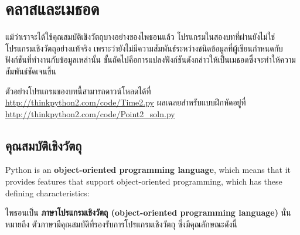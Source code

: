 \chapter{คลาสและเมธอด} %


แม้ว่าเราจะได้ใช้คุณสมบัติเชิงวัตถุบางอย่างของไพธอนแล้ว โปรแกรมในสองบทที่ผ่านยังไม่ใช่โปรแกรมเชิงวัตถุอย่างแท้จริง
เพราะว่ายังไม่มีความสัมพันธ์ระหว่างชนิดข้อมูลที่ผู้เขียนกำหนดกับฟังก์ชันที่ทำงานกับข้อมูลเหล่านั้น 
ขั้นถัดไปคือการแปลงฟังก์ชันดังกล่าวให้เป็นเมธอดซึ่งจะทำให้ความสัมพันธ์ชัดเจนขึ้น



ตัวอย่างโปรแกรมของบทนี้สามารถดาวน์โหลดได้ที่ \url{http://thinkpython2.com/code/Time2.py}
ผลเฉลยสำหรับแบบฝึกหัดอยู่ที่ \url{http://thinkpython2.com/code/Point2_soln.py}

\section{คุณสมบัติเชิงวัตถุ} %

Python is an {\bf object-oriented programming language}, which means
that it provides features that support object-oriented
programming, which has these defining characteristics:

ไพธอนเป็น {\bf ภาษาโปรแกรมเชิงวัตถุ (object-oriented programming language)} นั่นหมายถึง ตัวภาษามีคุณสมบัติที่รองรับการโปรแกรมเชิงวัตถุ ซึ่งมีคุณลักษณะดังนี้

